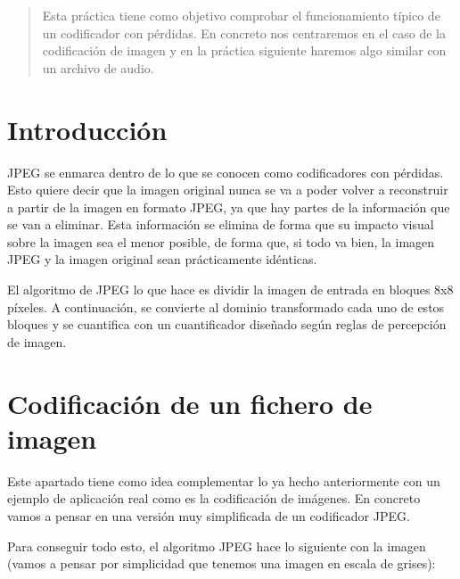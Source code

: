 \documentclass[es,practica]{uah}
\begin{document}

\maketitle

\begin{abstract}
Esta práctica tiene como objetivo comprobar el funcionamiento típico de un codificador con pérdidas. En concreto nos centraremos en el caso de la codificación de imagen y en la práctica siguiente haremos algo similar con un archivo de audio. 
\end{abstract}

\section{Introducción}
JPEG se enmarca dentro de lo que se conocen como codificadores con pérdidas. Esto quiere decir que la imagen original nunca se va a poder volver a reconstruir a partir de la imagen en formato JPEG, ya que hay partes de la información que se van a eliminar. Esta información se elimina de forma que su impacto visual sobre la imagen sea el menor posible, de forma que, si todo va bien, la imagen JPEG y la imagen original sean prácticamente idénticas. 

El algoritmo de JPEG lo que hace es dividir la imagen de entrada en bloques 8x8 píxeles. A continuación, se convierte al dominio transformado cada uno de estos bloques y se cuantifica con un cuantificador diseñado según reglas de percepción de imagen. 


\section{Codificación de un fichero de imagen}

Este apartado tiene como idea complementar lo ya hecho anteriormente con un ejemplo de aplicación real como es la codificación de imágenes. En concreto vamos a pensar en una versión muy simplificada de un codificador JPEG. 

Para conseguir todo esto, el algoritmo JPEG hace lo siguiente con la imagen (vamos a pensar por simplicidad que tenemos una imagen en escala de grises):
\end{document}
